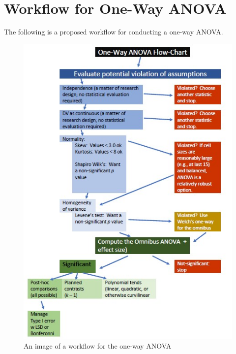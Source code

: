 \documentclass[
  english,
]{book}
\begin{document}
\hypertarget{workflow-for-one-way-anova}{%
\section{Workflow for One-Way ANOVA}\label{workflow-for-one-way-anova}}

The following is a proposed workflow for conducting a one-way ANOVA.

\begin{figure}
\centering
\includegraphics{images/OnewayWrkFlw.jpg}
\caption{An image of a workflow for the one-way ANOVA}
\end{figure}
\end{document}
